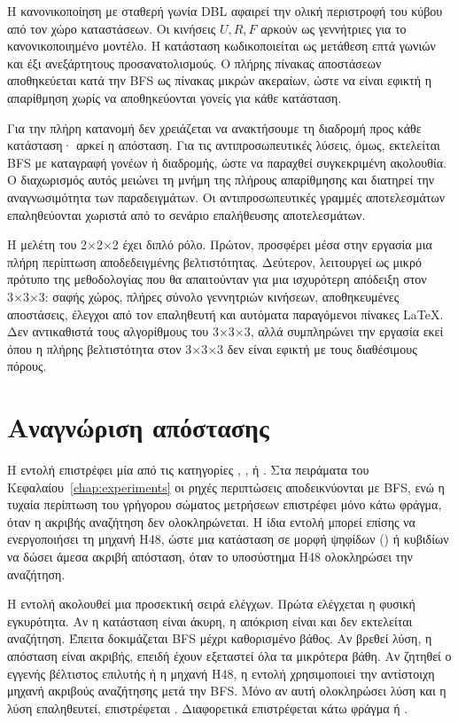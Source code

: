 Η κανονικοποίηση με σταθερή γωνία DBL αφαιρεί την ολική περιστροφή του κύβου από τον χώρο καταστάσεων. Οι κινήσεις \(U,R,F\) αρκούν ως γεννήτριες για το κανονικοποιημένο μοντέλο. Η κατάσταση κωδικοποιείται ως μετάθεση επτά γωνιών και έξι ανεξάρτητους προσανατολισμούς. Ο πλήρης πίνακας αποστάσεων αποθηκεύεται κατά την BFS ως πίνακας μικρών ακεραίων, ώστε να είναι εφικτή η απαρίθμηση χωρίς να αποθηκεύονται γονείς για κάθε κατάσταση.

Για την πλήρη κατανομή δεν χρειάζεται να ανακτήσουμε τη διαδρομή προς κάθε κατάσταση· αρκεί η απόσταση. Για τις αντιπροσωπευτικές λύσεις, όμως, εκτελείται BFS με καταγραφή γονέων ή διαδρομής, ώστε να παραχθεί συγκεκριμένη ακολουθία. Ο διαχωρισμός αυτός μειώνει τη μνήμη της πλήρους απαρίθμησης και διατηρεί την αναγνωσιμότητα των παραδειγμάτων. Οι αντιπροσωπευτικές γραμμές αποτελεσμάτων επαληθεύονται χωριστά από το σενάριο επαλήθευσης αποτελεσμάτων.

Η μελέτη του 2×2×2 έχει διπλό ρόλο. Πρώτον, προσφέρει μέσα στην εργασία μια πλήρη περίπτωση αποδεδειγμένης βελτιστότητας. Δεύτερον, λειτουργεί ως μικρό πρότυπο της μεθοδολογίας που θα απαιτούνταν για μια ισχυρότερη απόδειξη στον 3×3×3: σαφής χώρος, πλήρες σύνολο γεννητριών κινήσεων, αποθηκευμένες αποστάσεις, έλεγχοι από τον επαληθευτή και αυτόματα παραγόμενοι πίνακες LaTeX. Δεν αντικαθιστά τους αλγορίθμους του 3×3×3, αλλά συμπληρώνει την εργασία εκεί όπου η πλήρης βελτιστότητα στον 3×3×3 δεν είναι εφικτή με τους διαθέσιμους πόρους.

\section{Αναγνώριση απόστασης}
\label{sec:algorithms-distance}
Η εντολή  επιστρέφει μία από τις κατηγορίες , ,  ή . Στα πειράματα του Κεφαλαίου~\ref{chap:experiments} οι ρηχές περιπτώσεις αποδεικνύονται με BFS, ενώ η τυχαία περίπτωση του γρήγορου σώματος μετρήσεων επιστρέφει μόνο κάτω φράγμα, όταν η ακριβής αναζήτηση δεν ολοκληρώνεται. Η ίδια εντολή μπορεί επίσης να ενεργοποιήσει τη μηχανή H48, ώστε μια κατάσταση σε μορφή ψηφίδων () ή κυβιδίων να δώσει άμεσα ακριβή απόσταση, όταν το υποσύστημα H48 ολοκληρώσει την αναζήτηση.

Η εντολή ακολουθεί μια προσεκτική σειρά ελέγχων. Πρώτα ελέγχεται η φυσική εγκυρότητα. Αν η κατάσταση είναι άκυρη, η απόκριση είναι  και δεν εκτελείται αναζήτηση. Έπειτα δοκιμάζεται BFS μέχρι καθορισμένο βάθος. Αν βρεθεί λύση, η απόσταση είναι ακριβής, επειδή έχουν εξεταστεί όλα τα μικρότερα βάθη. Αν ζητηθεί ο εγγενής βέλτιστος επιλυτής ή η μηχανή H48, η εντολή χρησιμοποιεί την αντίστοιχη μηχανή ακριβούς αναζήτησης μετά την BFS. Μόνο αν αυτή ολοκληρώσει λύση και η λύση επαληθευτεί, επιστρέφεται . Διαφορετικά επιστρέφεται κάτω φράγμα ή .

